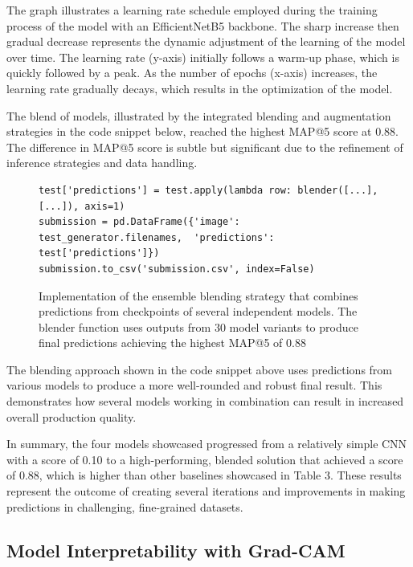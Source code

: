 \documentclass[twocolumn]{article}
\begin{document}
The graph illustrates a learning rate schedule employed during the training process of the model with an EfficientNetB5 backbone. The sharp increase then gradual decrease represents the dynamic adjustment of the learning of the model over time. The learning rate (y-axis) initially follows a warm-up phase, which is quickly followed by a peak. As the number of epochs (x-axis) increases, the learning rate gradually decays, which results in the optimization of the model. 

The blend of models, illustrated by the integrated blending and augmentation strategies in the code snippet below, reached the highest MAP@5 score at 0.88. The difference in MAP@5 score is subtle but significant due to the refinement of inference strategies and data handling.

\begin{figure}[h!]
\centering
\begin{minipage}{0.99\linewidth}
\begin{lstlisting}
test['predictions'] = test.apply(lambda row: blender([...], [...]), axis=1)
submission = pd.DataFrame({'image': test_generator.filenames,  'predictions': test['predictions']})
submission.to_csv('submission.csv', index=False)
\end{lstlisting}
\end{minipage}
\caption{Implementation of the ensemble blending strategy that combines predictions from checkpoints of several independent models. The blender function uses outputs from 30 model variants to produce final predictions achieving the highest MAP@5 of 0.88}
\end{figure}

The blending approach shown in the code snippet above uses predictions from various models to produce a more well-rounded and robust final result. This demonstrates how several models working in combination can result in increased overall production quality.

In summary, the four models showcased progressed from a relatively simple CNN with a score of 0.10 to a high-performing, blended solution that achieved a score of 0.88, which is higher than other baselines showcased in Table 3. These results represent the outcome of creating several iterations and improvements in making predictions in challenging, fine-grained datasets.

\subsection{Model Interpretability with Grad-CAM}
\end{document}
